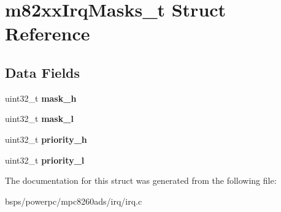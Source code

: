 \hypertarget{structm82xxIrqMasks__t}{}\section{m82xx\+Irq\+Masks\+\_\+t Struct Reference}
\label{structm82xxIrqMasks__t}
\subsection*{Data Fields}
\begin{DoxyCompactItemize}
\item 
\mbox{\label{structm82xxIrqMasks__t_a7c151a79f7280c8e64fc11189e81c2d6}} 
uint32\+\_\+t {\bfseries mask\+\_\+h}
\item 
\mbox{\label{structm82xxIrqMasks__t_a31fc9a1faa3714bbcb7c5843b7e792a6}} 
uint32\+\_\+t {\bfseries mask\+\_\+l}
\item 
\mbox{\label{structm82xxIrqMasks__t_a1d2a8daba5c3fd92862ebb2e78006510}} 
uint32\+\_\+t {\bfseries priority\+\_\+h}
\item 
\mbox{\label{structm82xxIrqMasks__t_adc866c205742e34fc8077f77073712dd}} 
uint32\+\_\+t {\bfseries priority\+\_\+l}
\end{DoxyCompactItemize}


The documentation for this struct was generated from the following file\+:\begin{DoxyCompactItemize}
\item 
bsps/powerpc/mpc8260ads/irq/irq.\+c\end{DoxyCompactItemize}
